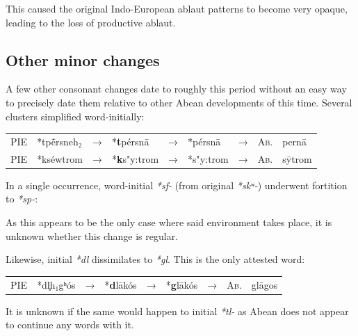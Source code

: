 \documentclass[svgnames,x11names,b5paper]{book}
\begin{document}
            This caused the original Indo-European ablaut patterns to become very opaque, leading to the loss of productive ablaut.

            \subsection{Other minor changes}
        
        A few other consonant changes date to roughly this period without an easy way to precisely date them relative to other Abean developments of this time. Several clusters simplified word-initially:

            \begin{table}[H]
                \begin{center}
                \begin{tabular}{llcllllll}
                \textsc{PIE} & *tpḗrsneh₂ & → & *\textbf{t}pérsnā & → & *pérsnā & → & \textsc{Ab.} & pernā\\
                \textsc{PIE} & *kséwtrom & → & *\textbf{k}s"y:trom & → & *s"y:trom & → & \textsc{Ab.} & sȳtrom\\
                \end{tabular}
                \end{center}
                \end{table}
        
        In a single occurrence, word-initial \textit{*sf-} (from original \textit{*skʷ-}) underwent fortition to \textit{*sp-}:

            As this appears to be the only case where said environment takes place, it is unknown whether this change is regular.

        Likewise, initial \textit{*dl} dissimilates to \textit{*gl}. This is the only attested word:

            \begin{table}[H]
                \begin{center}
                \begin{tabular}{llcllllll}
                \textsc{PIE} & *dl̥h₁gʰós & → & *\textbf{d}lākós & → & *\textbf{g}lākós & → & \textsc{Ab.} & glāgos\\
                \end{tabular}
                \end{center}
                \end{table}
        
            It is unknown if the same would happen to initial \textit{*tl-} as Abean does not appear to continue any words with it.
\end{document}
